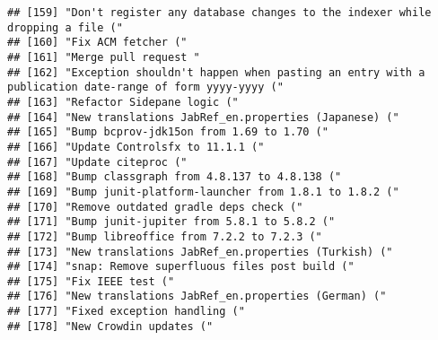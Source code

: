 \documentclass[
]{article}
\begin{document}
\begin{verbatim}
## [159] "Don't register any database changes to the indexer while dropping a file ("                                                 
## [160] "Fix ACM fetcher ("                                                                                                          
## [161] "Merge pull request "                                                                                                        
## [162] "Exception shouldn't happen when pasting an entry with a publication date-range of form yyyy-yyyy ("                         
## [163] "Refactor Sidepane logic ("                                                                                                  
## [164] "New translations JabRef_en.properties (Japanese) ("                                                                         
## [165] "Bump bcprov-jdk15on from 1.69 to 1.70 ("                                                                                    
## [166] "Update Controlsfx to 11.1.1 ("                                                                                              
## [167] "Update citeproc ("                                                                                                          
## [168] "Bump classgraph from 4.8.137 to 4.8.138 ("                                                                                  
## [169] "Bump junit-platform-launcher from 1.8.1 to 1.8.2 ("                                                                         
## [170] "Remove outdated gradle deps check ("                                                                                        
## [171] "Bump junit-jupiter from 5.8.1 to 5.8.2 ("                                                                                   
## [172] "Bump libreoffice from 7.2.2 to 7.2.3 ("                                                                                     
## [173] "New translations JabRef_en.properties (Turkish) ("                                                                          
## [174] "snap: Remove superfluous files post build ("                                                                                
## [175] "Fix IEEE test ("                                                                                                            
## [176] "New translations JabRef_en.properties (German) ("                                                                           
## [177] "Fixed exception handling ("                                                                                                 
## [178] "New Crowdin updates ("                                                                                                      

\end{verbatim}
\end{document}

